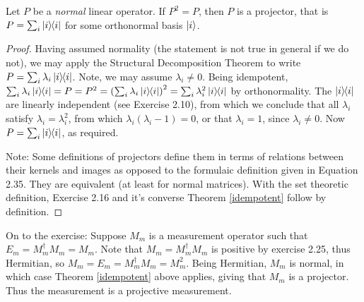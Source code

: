 \begin{screen}
\begin{thm}\label{idempotent}
	Let $P$ be a {\em normal} linear operator.  If $P^2 = P$, then $P$ is a projector, that is $P=\sum_i \ket{i}\hspace{-1mm} \bra{i}$ for some orthonormal basis $\ket{i}$.
\end{thm}
\begin{proof} Having assumed normality (the statement is not true in general if we do not), we may apply the Structural Decomposition Theorem to write $P=\sum_i\lambda_i \ket{i}\hspace{-1mm} \bra{i}$.  Note, we may assume $\lambda_i \neq 0$.  Being idempotent, $\sum_i\lambda_i \ket{i}\hspace{-1mm} \bra{i} = P = P^2 = \left(\sum_i\lambda_i \ket{i}\hspace{-1mm} \bra{i}\right)^2 = \sum_i \lambda_i^2 \ket{i}\hspace{-1mm} \bra{i}$ by orthonormality.  The $\ket{i}\hspace{-1mm} \bra{i}$ are linearly independent (see Exercise 2.10), from which we conclude that all $\lambda_i$ satisfy $\lambda_i = \lambda_i^2$, from which $\lambda_i(\lambda_i-1) = 0$, or that $\lambda_i = 1$, since $\lambda_i\neq 0$.  Now $P = \sum_i \ket{i}\hspace{-1mm} \bra{i}$, as required.

Note: Some definitions of projectors define them in terms of relations between their kernels and images as opposed to the formulaic definition given in Equation 2.35.  They are equivalent (at least for normal matrices).  With the set theoretic definition, Exercise 2.16 and it's converse Theorem \ref{idempotent} follow by definition.
\end{proof}
\end{screen}
On to the exercise:  Suppose $M_m$ is a measurement operator such that $E_m = M_m^\dagger M_m = M_m$.  Note that $M_m = M_m^\dagger M_m$ is positive by exercise 2.25, thus Hermitian, so  $M_m =  E_m = M_m^\dagger M_m = M_m^2$.  Being Hermitian, $M_m$ is normal, in which case Theorem \ref{idempotent} above applies, giving that $M_m$ is a projector.  Thus the measurement is a projective measurement.

